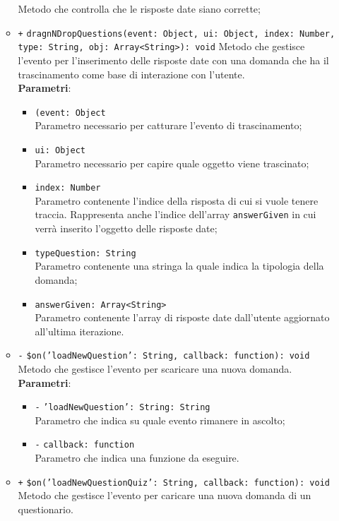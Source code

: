 \begin{itemize}
\begin{itemize}
	Metodo che controlla che le risposte date siano corrette;
	\item \texttt{+} \texttt{dragnNDropQuestions(event: Object, ui: Object, index: Number, type: String, obj: Array<String>): void} 
	Metodo che gestisce l'evento per l'inserimento delle risposte date con una domanda che ha il trascinamento come base di interazione con l'utente. \\
	\textbf{Parametri}:
	\begin{itemize}
		\item \texttt{(event: Object} \\
		Parametro necessario per catturare l'evento di trascinamento;
		\item \texttt{ui: Object} \\
		Parametro necessario per capire quale oggetto viene trascinato;
		\item \texttt{index: Number} \\
		Parametro contenente l'indice della risposta di cui si vuole tenere traccia. Rappresenta anche l'indice dell'array \texttt{answerGiven} in cui verrà inserito l'oggetto delle risposte date;
		\item \texttt{typeQuestion: String} \\
		Parametro contenente una stringa la quale indica la tipologia della domanda;
		\item \texttt{answerGiven: Array<String>} \\
		Parametro contenente l'array di risposte date dall'utente aggiornato all'ultima iterazione.
	\end{itemize}
	\item \texttt{-} \texttt{\$on('loadNewQuestion': String, callback: function): void} \\
	Metodo che gestisce l'evento per scaricare una nuova domanda. \\
	\textbf{Parametri}:
	\begin{itemize}
		\item \texttt{-} \texttt{'loadNewQuestion': String: String} \\
		Parametro che indica su quale evento rimanere in ascolto;
		\item \texttt{-} \texttt{callback: function} \\
		Parametro che indica una funzione da eseguire.
	\end{itemize}
	\item \texttt{+} \texttt{\$on('loadNewQuestionQuiz': String, callback: function): void} \\
	Metodo che gestisce l'evento per caricare una nuova domanda di un questionario.\\

\end{itemize}
\end{itemize}

